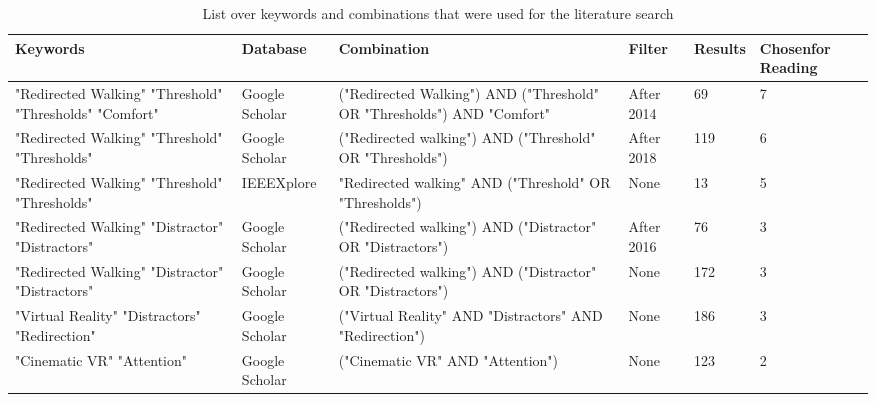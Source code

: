 \begin{table}[tbh!]
\centering
\begin{tabularx}{\textwidth}{|m{2cm}|m{1.7cm}|m{2.7cm}|m{1.5cm}|m{1.20cm}|m{3.375cm}|} 
\hline
Keywords & Database & Combination & Filter & Results & Chosen\newline for Reading\\ 
\hline
"Redirected Walking"\newline
"Threshold"\newline
"Thresholds"\newline
"Comfort"& Google Scholar & ("Redirected Walking") AND ("Threshold" OR "Thresholds") AND "Comfort" & After 2014 & 69 & 7\\ 
\hline
"Redirected Walking"\newline
"Threshold"\newline
"Thresholds" & Google Scholar & ("Redirected walking") AND ("Threshold" OR "Thresholds") & After 2018 & 119 & 6\\
\hline
"Redirected Walking"\newline
"Threshold"\newline
"Thresholds" & IEEEXplore & "Redirected walking" AND ("Threshold" OR "Thresholds") & None & 13 & 5\\ 
\hline
"Redirected Walking"\newline
"Distractor"\newline
"Distractors" & Google Scholar & ("Redirected walking") AND ("Distractor" OR "Distractors") & After 2016 & 76 & 3\\
\hline
"Redirected Walking"\newline
"Distractor"\newline
"Distractors" & Google Scholar & ("Redirected walking") AND ("Distractor" OR "Distractors") & None & 172 & 3\\
\hline
"Virtual Reality"\newline
"Distractors"\newline
"Redirection" & Google Scholar & ("Virtual Reality" AND "Distractors" AND "Redirection") & None & 186 & 3\\
\hline
"Cinematic VR"\newline
"Attention" & Google Scholar & ("Cinematic VR" AND "Attention") & None & 123 & 2\\
\hline
\end{tabularx}
\caption{List over keywords and combinations that were used for the literature search}
\label{table:literaturekeywords}
\end{table}

